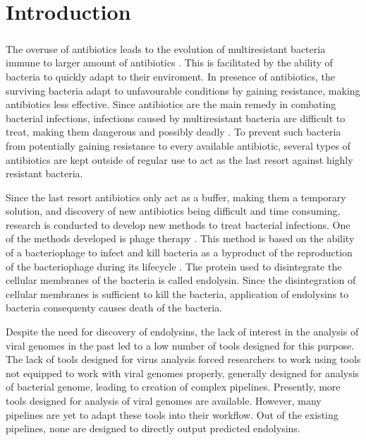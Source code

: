 \chapter*{Introduction} %

\paragraph*{}
The overuse of antibiotics leads to the evolution of multiresistant bacteria immune to larger amount of antibiotics \cite{nikaido2009multidrug}. This is facilitated by the ability of bacteria to quickly adapt to their enviroment. In presence of antibiotics, the surviving bacteria adapt to unfavourable conditions by gaining resistance, making antibiotics less effective. Since antibiotics are the main remedy in combating bacterial infections, infections caused by multiresistant bacteria are difficult to treat, making them dangerous and possibly deadly \cite{mckenna2013last}. To prevent such bacteria from potentially gaining resistance to every available antibiotic, several types of antibiotics are kept outside of regular use to act as the last resort against highly resistant bacteria.

Since the last resort antibiotics only act as a buffer, making them a temporary solution, and discovery of new antibiotics being difficult and time consuming, research is conducted to develop new methods to treat bacterial infections. One of the methods developed is phage therapy \cite{vandenheuvel2015bacteriophage}. This method is based on the ability of a bacteriophage to infect and kill bacteria as a byproduct of the reproduction of the bacteriophage during its lifecycle \cite{gordillo2019phage}. The protein used to disintegrate the cellular membranes of the bacteria is called endolysin. Since the disintegration of cellular membranes is sufficient to kill the bacteria, application of endolysins to bacteria consequenty causes death of the bacteria. 

Despite the need for discovery of endolysins, the lack of interest in the analysis of viral genomes in the past led to a low number of tools designed for this purpose. The lack of tools designed for virus analysis forced researchers to work using tools not equipped to work with viral genomes properly, generally designed for analysis of bacterial genome, leading to creation of complex pipelines. Presently, more tools designed for analysis of viral genomes are available. However, many pipelines are yet to adapt these tools into their workflow. Out of the existing pipelines, none are designed to directly output predicted endolysins.

